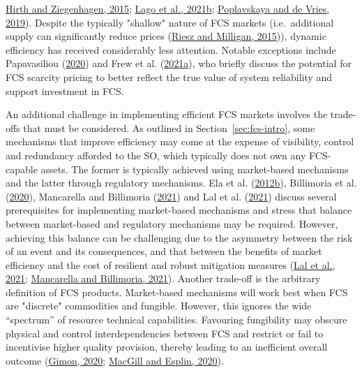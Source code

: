 \documentclass[12pt,a4paper,]{report}
\begin{document}
\protect\hyperlink{ref-hirthBalancingPowerVariable2015}{Hirth and
Ziegenhagen, 2015};
\protect\hyperlink{ref-lagoMarketFrameworkGrid2021}{Lago et al., 2021b};
\protect\hyperlink{ref-poplavskayaDistributedEnergyResources2019}{Poplavskaya
and de Vries, 2019}). Despite the typically "shallow" nature of FCS
markets (i.e.~additional supply can significantly reduce prices
(\protect\hyperlink{ref-rieszDesigningElectricityMarkets2015}{Riesz and
Milligan, 2015})), dynamic efficiency has received considerably less
attention. Notable exceptions include Papavasiliou
(\protect\hyperlink{ref-papavasiliouScarcityPricingMissing2020}{2020})
and Frew et al.
(\protect\hyperlink{ref-frewImpactOperatingReserve2021}{2021a}), who
briefly discuss the potential for FCS scarcity pricing to better reflect
the true value of system reliability and support investment in FCS.

An additional challenge in implementing efficient FCS markets involves
the trade-offs that must be considered. As outlined in
Section~\ref{sec:fcs-intro}, some mechanisms that improve efficiency may
come at the expense of visibility, control and redundancy afforded to
the SO, which typically does not own any FCS-capable assets. The former
is typically achieved using market-based mechanisms and the latter
through regulatory mechanisms. Ela et al.
(\protect\hyperlink{ref-elaAlternativeApproachesIncentivizing2012}{2012b}),
Billimoria et al.
(\protect\hyperlink{ref-billimoriaMarketDesignSystem2020}{2020}),
Mancarella and Billimoria
(\protect\hyperlink{ref-mancarellaFragileGridPhysics2021}{2021}) and Lal
et al. (\protect\hyperlink{ref-lalEssentialSystemServices2021}{2021})
discuss several prerequisites for implementing market-based mechanisms
and stress that balance between market-based and regulatory mechanisms
may be required. However, achieving this balance can be challenging due
to the asymmetry between the risk of an event and its consequences, and
that between the benefits of market efficiency and the cost of resilient
and robust mitigation measures
(\protect\hyperlink{ref-lalEssentialSystemServices2021}{Lal et al.,
2021};
\protect\hyperlink{ref-mancarellaFragileGridPhysics2021}{Mancarella and
Billimoria, 2021}). Another trade-off is the arbitrary definition of FCS
products. Market-based mechanisms will work best when FCS are "discrete"
commodities and fungible. However, this ignores the wide ``spectrum'' of
resource technical capabilities. Favouring fungibility may obscure
physical and control interdependencies between FCS and restrict or fail
to incentivise higher quality provision, thereby leading to an
inefficient overall outcome
(\protect\hyperlink{ref-gimonGridPhysicsMarkets2020}{Gimon, 2020};
\protect\hyperlink{ref-macgillEndtoendElectricityMarket2020}{MacGill and
Esplin, 2020}).
\end{document}
